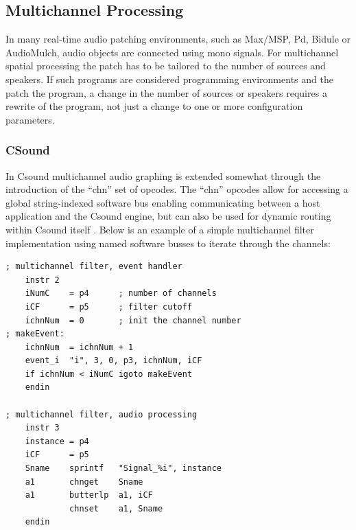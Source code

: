 \documentclass[twoside,a4paper]{article}
\begin{document}


\subsection{Multichannel Processing} %

In many real-time audio patching environments, such as Max/MSP, Pd, Bidule or AudioMulch, audio objects are connected using mono signals. 
For multichannel spatial processing the patch has to be tailored to the number of sources and speakers. 
If such programs are considered programming environments and the patch the program, a change in the number of sources or speakers requires a rewrite of the program, not just a change to one or more configuration parameters.


\subsubsection{CSound} %

In Csound multichannel audio graphing is extended somewhat through the introduction of the ``chn'' set of opcodes.
The ``chn'' opcodes allow for accessing a global string-indexed software bus enabling communicating between a host application and the Csound engine, but can also be used for dynamic routing within Csound itself \cite{Yi:2006}.
Below is an example of  a simple multichannel filter implementation using named software busses to iterate through the channels:


\begin{lstlisting}
; multichannel filter, event handler 
    instr 2 
    iNumC    = p4      ; number of channels 
    iCF      = p5      ; filter cutoff 
    ichnNum  = 0       ; init the channel number 
; makeEvent:
    ichnNum  = ichnNum + 1
    event_i  "i", 3, 0, p3, ichnNum, iCF
    if ichnNum < iNumC igoto makeEvent
    endin

; multichannel filter, audio processing
    instr 3    
    instance = p4
    iCF      = p5
    Sname    sprintf   "Signal_%i", instance        
    a1       chnget    Sname
    a1       butterlp  a1, iCF
             chnset    a1, Sname
    endin
\end{lstlisting}  
\end{document}

